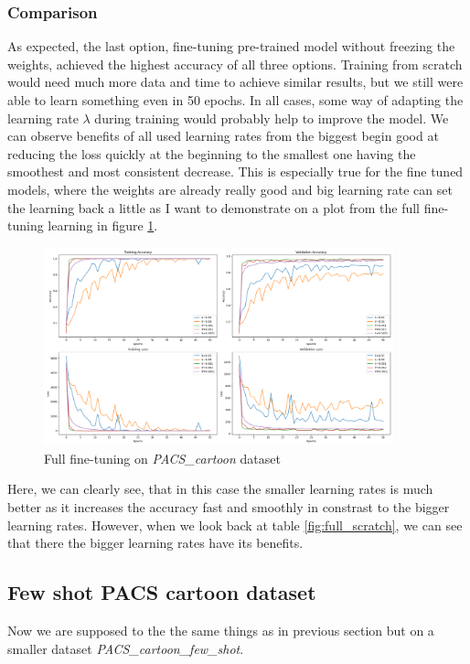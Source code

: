 \documentclass[a4paper,11pt]{article}
\begin{document}
\subsubsection{Comparison}
As expected, the last option, fine-tuning pre-trained model without freezing the weights, achieved the highest accuracy of all three options.
Training from scratch would need much more data and time to achieve similar results, but we still were able to learn something even in 50 epochs.
In all cases, some way of adapting the learning rate $\lambda$ during training would probably help to improve the model.
We can observe benefits of all used learning rates from the biggest begin good at reducing the loss quickly at the beginning to the smallest one having the smoothest and most consistent decrease.
This is especially true for the fine tuned models, where the weights are already really good and big learning rate can set the learning back a little as I want to demonstrate on a plot from the full fine-tuning learning in figure \ref{fig:full_fine_tuning}.

\begin{figure}[ht]
    \centering
    \includegraphics[width=0.9\textwidth]{../out/single_shot_full_fine_tuning.png}
    \caption{Full fine-tuning on \textit{PACS\_cartoon} dataset}
    \label{fig:full_fine_tuning}
\end{figure}

Here, we can clearly see, that in this case the smaller learning rates is much better as it increases the accuracy fast and smoothly in constrast to the bigger learning rates.
However, when we look back at table \ref{fig:full_scratch}, we can see that there the bigger learning rates have its benefits.

\subsection{Few shot PACS cartoon dataset}
Now we are supposed to the the same things as in previous section but on a smaller dataset \textit{PACS\_cartoon\_few\_shot}.
\end{document}
